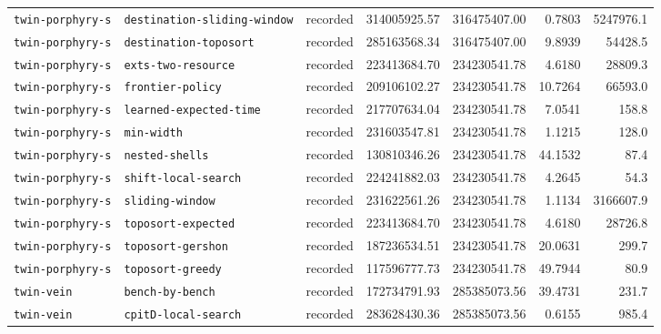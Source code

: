 \begin{longtable}{>{\raggedright\arraybackslash}p{}>{\raggedright\arraybackslash}p{}r r r r r}
\texttt{twin\allowbreak-porphyry\allowbreak-s} & \texttt{destination\allowbreak-sliding\allowbreak-window} & recorded & 314005925.57 & 316475407.00 & 0.7803 & 5247976.1 \\
\texttt{twin\allowbreak-porphyry\allowbreak-s} & \texttt{destination\allowbreak-toposort} & recorded & 285163568.34 & 316475407.00 & 9.8939 & 54428.5 \\
\texttt{twin\allowbreak-porphyry\allowbreak-s} & \texttt{exts\allowbreak-two\allowbreak-resource} & recorded & 223413684.70 & 234230541.78 & 4.6180 & 28809.3 \\
\texttt{twin\allowbreak-porphyry\allowbreak-s} & \texttt{frontier\allowbreak-policy} & recorded & 209106102.27 & 234230541.78 & 10.7264 & 66593.0 \\
\texttt{twin\allowbreak-porphyry\allowbreak-s} & \texttt{learned\allowbreak-expected\allowbreak-time} & recorded & 217707634.04 & 234230541.78 & 7.0541 & 158.8 \\
\texttt{twin\allowbreak-porphyry\allowbreak-s} & \texttt{min\allowbreak-width} & recorded & 231603547.81 & 234230541.78 & 1.1215 & 128.0 \\
\texttt{twin\allowbreak-porphyry\allowbreak-s} & \texttt{nested\allowbreak-shells} & recorded & 130810346.26 & 234230541.78 & 44.1532 & 87.4 \\
\texttt{twin\allowbreak-porphyry\allowbreak-s} & \texttt{shift\allowbreak-local\allowbreak-search} & recorded & 224241882.03 & 234230541.78 & 4.2645 & 54.3 \\
\texttt{twin\allowbreak-porphyry\allowbreak-s} & \texttt{sliding\allowbreak-window} & recorded & 231622561.26 & 234230541.78 & 1.1134 & 3166607.9 \\
\texttt{twin\allowbreak-porphyry\allowbreak-s} & \texttt{toposort\allowbreak-expected} & recorded & 223413684.70 & 234230541.78 & 4.6180 & 28726.8 \\
\texttt{twin\allowbreak-porphyry\allowbreak-s} & \texttt{toposort\allowbreak-gershon} & recorded & 187236534.51 & 234230541.78 & 20.0631 & 299.7 \\
\texttt{twin\allowbreak-porphyry\allowbreak-s} & \texttt{toposort\allowbreak-greedy} & recorded & 117596777.73 & 234230541.78 & 49.7944 & 80.9 \\
\texttt{twin\allowbreak-vein} & \texttt{bench\allowbreak-by\allowbreak-bench} & recorded & 172734791.93 & 285385073.56 & 39.4731 & 231.7 \\
\texttt{twin\allowbreak-vein} & \texttt{cpitD\allowbreak-local\allowbreak-search} & recorded & 283628430.36 & 285385073.56 & 0.6155 & 985.4 \\

\end{longtable}
